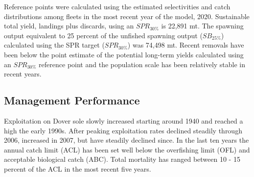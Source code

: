 \documentclass[11pt,
  english,
  a4paper,
]{article}
\begin{document}
\tagmcend\tagstructend


Reference points were calculated using the estimated selectivities and catch distributions among fleets in the most recent year of the model, 2020. Sustainable total yield, landings plus discards, using an {\(SPR_{30\%}\)\leavevmode\tagmcend\tagstructend} is 22,891 mt. The spawning output equivalent to 25 percent of the unfished spawning output ({\(SB_{25\%}\)\leavevmode\tagmcend\tagstructend}) calculated using the SPR target ({\(SPR_{30\%}\)\leavevmode\tagmcend\tagstructend}) was 74,498 mt. Recent removals have been below the point estimate of the potential long-term yields calculated using an {\(SPR_{30\%}\)\leavevmode\tagmcend\tagstructend} reference point and the population scale has been relatively stable in recent years.

\leavevmode\tagmcend\tagstructend\par



\clearpage


\hypertarget{management-performance}{%
\subsection*{Management Performance}\label{management-performance}}

\leavevmode\tagmcend\tagstructend


Exploitation on Dover sole slowly increased starting around 1940 and reached a high the early 1990s. After peaking exploitation rates declined steadily through 2006, increased in 2007, but have steadily declined since. In the last ten years the annual catch limit (ACL) has been set well below the overfishing limit (OFL) and acceptable biological catch (ABC). Total mortality has ranged between 10 - 15 percent of the ACL in the most recent five years.

\leavevmode\tagmcend\tagstructend\par
\end{document}
